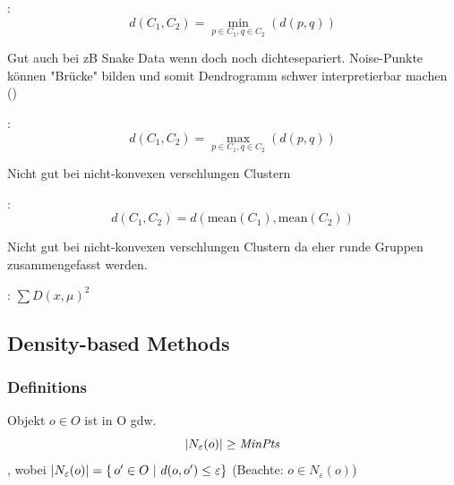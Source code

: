 \documentclass[10pt]{article} %
\DeclarePairedDelimiter\abs{\lvert}{\rvert}%
\begin{document}
\begin{cptitemize} 
     \item \textbf{}: 
     $$d(C_1, C_2) = \min_{p \in C_1, q \in C_2} ( d(p,q) ) $$ 
     \begin{cptitemize} 
            \advantageit Gut auch bei zB Snake Data wenn doch noch dichtesepariert.
             \disadvantageit Noise-Punkte können "Brücke" bilden und somit Dendrogramm schwer interpretierbar machen ()
     \end{cptitemize} 
     \item \textbf{}: 
     $$d(C_1, C_2) = \max_{p \in C_1, q \in C_2}(d(p,q))$$
     \begin{cptitemize} 
       \disadvantageit Nicht gut bei nicht-konvexen verschlungen Clustern   
     \end{cptitemize} 
     \item \textbf{}: 
     $$d(C_1, C_2) = d( \text{mean}(C_1), \text{mean}(C_2) )$$
     \begin{cptitemize} 
       \disadvantageit Nicht gut bei nicht-konvexen verschlungen Clustern  da eher runde Gruppen zusammengefasst werden.
     \end{cptitemize} 
     \item \textbf{} : $\sum D(x, \mu)^2$
\end{cptitemize} 




\subsection{Density-based Methods}

\subsubsection{Definitions}

\begin{definition} 
     Objekt $o \in O$ ist  in O gdw.
$$\abs{N_\varepsilon(o)} \geq \mathit{MinPts}$$, wobei $\abs{N_\varepsilon(o)} = \{\, o' \in O \,\,|\,\, d(o,o') \leq \varepsilon\} $ (Beachte: $o \in N_\varepsilon(o)$) 
\end{definition} 
\end{document}
